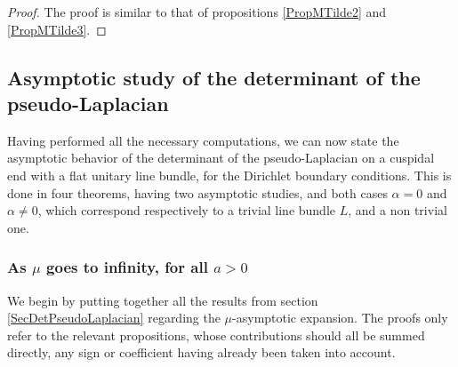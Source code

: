 \documentclass{jams-l}
\theoremstyle{definition}
\theoremstyle{remark}
\numberwithin{equation}{section}
\begin{document}
                \begin{proof}
                
                    The proof is similar to that of propositions \ref{PropMTilde2} and \ref{PropMTilde3}.
                
                \end{proof}
            
            
    \subsection{Asymptotic study of the determinant of the pseudo-Laplacian}
    
        Having performed all the necessary computations, we can now state the asymptotic behavior of the determinant of the pseudo-Laplacian on a cuspidal end with a flat unitary line bundle, for the Dirichlet boundary conditions. This is done in four theorems, having two asymptotic studies, and both cases $\alpha = 0$ and $\alpha \neq 0$, which correspond respectively to a trivial line bundle $L$, and a non trivial one.
        
        
        \subsubsection{As $\mu$ goes to infinity, for all $a>0$}
        
            We begin by putting together all the results from section \ref{SecDetPseudoLaplacian} regarding the $\mu$-asymptotic expansion. The proofs only refer to the relevant propositions, whose contributions should all be summed directly, any sign or coefficient having already been taken into account.
        
\end{document}
